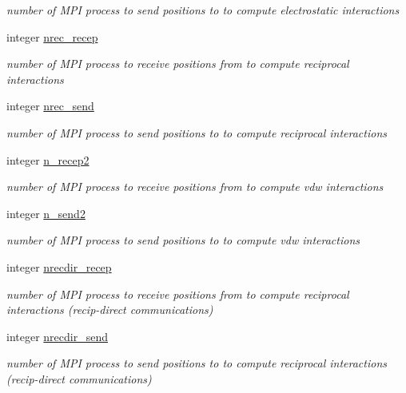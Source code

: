 \begin{DoxyCompactItemize}
\begin{DoxyCompactList}\small\item\em number of M\-P\-I process to send positions to to compute electrostatic interactions \end{DoxyCompactList}\item 
integer \hyperlink{classdomdec_a5f5bedc0c1ff6f221a8d5962dacd02ca}{nrec\-\_\-recep}
\begin{DoxyCompactList}\small\item\em number of M\-P\-I process to receive positions from to compute reciprocal interactions \end{DoxyCompactList}\item 
integer \hyperlink{classdomdec_a241ed59d98796089944cc13db0db566b}{nrec\-\_\-send}
\begin{DoxyCompactList}\small\item\em number of M\-P\-I process to send positions to to compute reciprocal interactions \end{DoxyCompactList}\item 
integer \hyperlink{classdomdec_abe55b19e68b835314f58393f920e9272}{n\-\_\-recep2}
\begin{DoxyCompactList}\small\item\em number of M\-P\-I process to receive positions from to compute vdw interactions \end{DoxyCompactList}\item 
integer \hyperlink{classdomdec_a0f486e85808300fa8cc875848802e6bb}{n\-\_\-send2}
\begin{DoxyCompactList}\small\item\em number of M\-P\-I process to send positions to to compute vdw interactions \end{DoxyCompactList}\item 
integer \hyperlink{classdomdec_a5aeb41a854f8678a4751145d51b6c3ab}{nrecdir\-\_\-recep}
\begin{DoxyCompactList}\small\item\em number of M\-P\-I process to receive positions from to compute reciprocal interactions (recip-\/direct communications) \end{DoxyCompactList}\item 
integer \hyperlink{classdomdec_ae3f9a9d0cf25f3d07550dd79ad9c84f8}{nrecdir\-\_\-send}
\begin{DoxyCompactList}\small\item\em number of M\-P\-I process to send positions to to compute reciprocal interactions (recip-\/direct communications) \end{DoxyCompactList}\item 

\end{DoxyCompactItemize}
